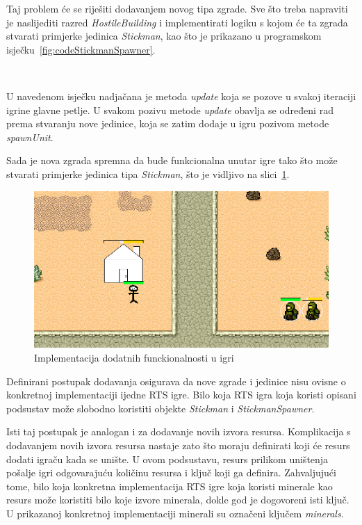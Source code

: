 \documentclass[times, utf8, zavrsni, numeric]{fer}
\begin{document}
\par Taj problem će se riješiti dodavanjem novog tipa zgrade.
Sve što treba napraviti je naslijediti razred \textit{HostileBuilding} i implementirati logiku s kojom će ta zgrada stvarati primjerke jedinica \textit{Stickman}, kao što je prikazano u programskom isječku~\ref{fig:codeStickmanSpawner}.

\vspace{3mm}
\begin{minipage}{\textwidth}
	
\end{minipage}\

\par U navedenom isječku nadjačana je metoda \textit{update} koja se pozove u svakoj iteraciji igrine glavne petlje.
U svakom pozivu metode \textit{update} obavlja se određeni rad prema stvaranju nove jedinice, koja se zatim dodaje u igru pozivom metode \textit{spawnUnit}.

\par Sada je nova zgrada spremna da bude funkcionalna unutar igre tako što može stvarati primjerke jedinica tipa \textit{Stickman}, što je vidljivo na slici~\ref{fig:stickman}.

\begin{figure}[h]
	\centering
	\includegraphics[width=0.7\linewidth]{images/stickman.png}
	\caption{Implementacija dodatnih funckionalnosti u igri}
	\label{fig:stickman}
\end{figure}

\par Definirani postupak dodavanja osigurava da nove zgrade i jedinice nisu ovisne o konkretnoj implementaciji ijedne RTS igre.
Bilo koja RTS igra koja koristi opisani podsustav može slobodno koristiti objekte \textit{Stickman} i \textit{StickmanSpawner}.

\par Isti taj postupak je analogan i za dodavanje novih izvora resursa.
Komplikacija s dodavanjem novih izvora resursa nastaje zato što moraju definirati koji će resurs dodati igraču kada se unište.
U ovom podsustavu, resurs prilikom uništenja pošalje igri odgovarajuću količinu resursa i ključ koji ga definira.
Zahvaljujući tome, bilo koja konkretna implementacija RTS igre koja koristi minerale kao resurs može koristiti bilo koje izvore minerala, dokle god je dogovoreni isti ključ.
U prikazanoj konkretnoj implementaciji minerali su označeni ključem \textit{minerals}.
\end{document}
